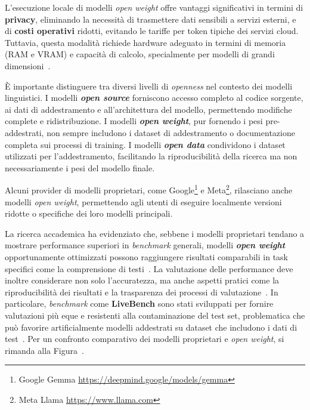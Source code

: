 \documentclass[12pt,twoside]{report}
\begin{document}
L'esecuzione locale di modelli \textit{open weight} offre vantaggi significativi in termini di \textbf{privacy}, eliminando la necessità di trasmettere dati sensibili a servizi esterni, e di \textbf{costi operativi} ridotti, evitando le tariffe per token tipiche dei servizi cloud. Tuttavia, questa modalità richiede hardware adeguato in termini di memoria (RAM e VRAM) e capacità di calcolo, specialmente per modelli di grandi dimensioni~\cite{bendiouis2024deploying_opensource}.

È importante distinguere tra diversi livelli di \textit{openness} nel contesto dei modelli linguistici. I modelli \textbf{\textit{open source}} forniscono accesso completo al codice sorgente, ai dati di addestramento e all'architettura del modello, permettendo modifiche complete e ridistribuzione. I modelli \textbf{\textit{open weight}}, pur fornendo i pesi pre-addestrati, non sempre includono i dataset di addestramento o documentazione completa sui processi di training. I modelli \textbf{\textit{open data}} condividono i dataset utilizzati per l'addestramento, facilitando la riproducibilità della ricerca ma non necessariamente i pesi del modello finale.

Alcuni provider di modelli proprietari, come Google\footnote{Google Gemma \url{https://deepmind.google/models/gemma}} e Meta\footnote{Meta Llama \url{https://www.llama.com}}, rilasciano anche modelli \textit{open weight}, permettendo agli utenti di eseguire localmente versioni ridotte o specifiche dei loro modelli principali.

La ricerca accademica ha evidenziato che, sebbene i modelli proprietari tendano a mostrare performance superiori in \textit{benchmark} generali, modelli \textbf{\textit{open weight}} opportunamente ottimizzati possono raggiungere risultati comparabili in task specifici come la comprensione di testi~\cite{alassan2024comparison_opensource_proprietary}. La valutazione delle performance deve inoltre considerare non solo l'accuratezza, ma anche aspetti pratici come la riproducibilità dei risultati e la trasparenza dei processi di valutazione~\cite{white2024livebench}. In particolare, \textit{benchmark} come \textbf{LiveBench} sono stati sviluppati per fornire valutazioni più eque e resistenti alla contaminazione del test set, problematica che può favorire artificialmente modelli addestrati su dataset che includono i dati di test~\cite{white2024livebench}. Per un confronto comparativo dei modelli proprietari e \textit{open weight}, si rimanda alla Figura~.
\end{document}
